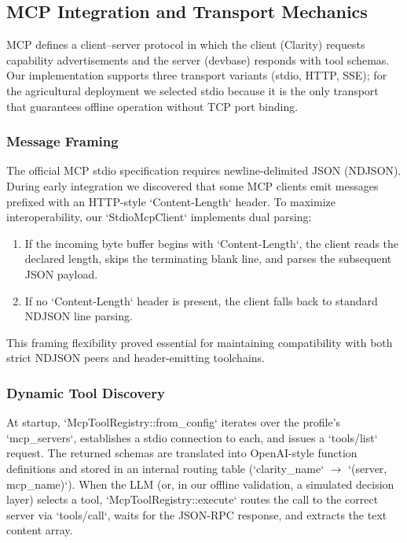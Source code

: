 \documentclass[11pt,a4paper]{article}
\begin{document}
\subsection{MCP Integration and Transport Mechanics}

MCP defines a client--server protocol in which the client (Clarity) requests capability advertisements and the server (devbase) responds with tool schemas. Our implementation supports three transport variants (stdio, HTTP, SSE); for the agricultural deployment we selected stdio because it is the only transport that guarantees offline operation without TCP port binding.

\subsubsection{Message Framing}

The official MCP stdio specification requires newline-delimited JSON (NDJSON). During early integration we discovered that some MCP clients emit messages prefixed with an HTTP-style `Content-Length` header. To maximize interoperability, our `StdioMcpClient` implements dual parsing:
\begin{enumerate}[leftmargin=*]
    \item If the incoming byte buffer begins with `Content-Length`, the client reads the declared length, skips the terminating blank line, and parses the subsequent JSON payload.
    \item If no `Content-Length` header is present, the client falls back to standard NDJSON line parsing.
\end{enumerate}
This framing flexibility proved essential for maintaining compatibility with both strict NDJSON peers and header-emitting toolchains.

\subsubsection{Dynamic Tool Discovery}

At startup, `McpToolRegistry::from\_config` iterates over the profile's `mcp\_servers`, establishes a stdio connection to each, and issues a `tools/list` request. The returned schemas are translated into OpenAI-style function definitions and stored in an internal routing table (`clarity\_name` $\rightarrow$ `(server, mcp\_name)`). When the LLM (or, in our offline validation, a simulated decision layer) selects a tool, `McpToolRegistry::execute` routes the call to the correct server via `tools/call`, waits for the JSON-RPC response, and extracts the text content array.
\end{document}
